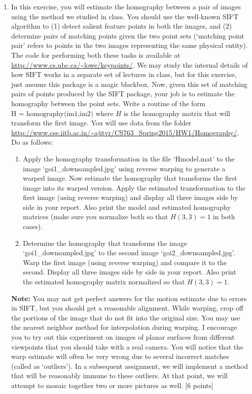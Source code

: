 \documentclass[11pt]{article}
\begin{document}
\begin{enumerate}
\begin{itemize}
\end{itemize}
\item In this exercise, you will estimate the homography between a pair of images using the method we studied in class. You should use the well-known SIFT algorithm to (1) detect salient feature points in both the images, and (2) determine pairs of matching points given the two point sets (`matching point pair' refers to points in the two images representing the same physical entity). The code for performing both these tasks is available at \url{http://www.cs.ubc.ca/~lowe/keypoints/}. We may study the internal details of how SIFT works in a separate set of lectures in class, but for this exercise, just assume this package is a magic blackbox. Now, given this set of matching pairs of points produced by the SIFT package, your job is to estimate the homography between the point sets. Write a routine of the form $\textrm{H = homography(im1,im2)}$ where $H$ is the homography matrix that will transform the first image. You will use data from the folder \url{http://www.cse.iitb.ac.in/~ajitvr/CS763_Spring2015/HW1/Homography/}. Do as follows:
\begin{enumerate}
\item Apply the homography transformation in the file `Hmodel.mat' to the image `goi1\_downsampled.jpg' using reverse warping to generate a warped image. Now estimate the homography that transforms the first image into its warped version. Apply the estimated transformation to the first image (using reverse warping) and display all three images side by side in your report. Also print the model and estimated homography matrices (make sure you normalize both so that $H(3,3) = 1$ in both cases). 
\item Determine the homography that transforms the image `goi1\_downsampled.jpg' to the second image  `goi2\_downsampled.jpg'. Warp the first image (using reverse warping) and compare it to the second. Display all three images side by side in your report. Also print the estimated homography matrix normalized so that $H(3,3) = 1$. 
\end{enumerate}
\textbf{Note:} You may not get perfect answers for the motion estimate due to errors in SIFT, but you should get a reasonable alignment. While warping, crop off the portions of the image that do not fit into the original size. You may use the nearest neighbor method for interpolation during warping. I encourage you to try out this experiment on images of planar surfaces from different viewpoints that you should take with a real camera. You will notice that the warp estimate will often be very wrong due to several incorrect matches (called as `outliers'). In a subsequent assignment, we will implement a method that will be reasonably immune to these outliers. At that point, we will attempt to mosaic together two or more pictures as well. \textsf{[6 points]}
\end{enumerate}
\end{document}
